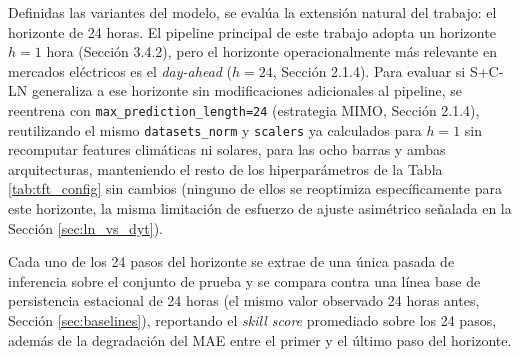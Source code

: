 Definidas las variantes del modelo, se evalúa la extensión natural del trabajo: el horizonte de 24 horas. El pipeline principal de este trabajo adopta un horizonte $h=1$ hora (Sección 3.4.2), pero el horizonte operacionalmente más relevante en mercados eléctricos es el \textit{day-ahead} ($h=24$, Sección 2.1.4). Para evaluar si S+C-LN generaliza a ese horizonte sin modificaciones adicionales al pipeline, se reentrena con \texttt{max\_prediction\_length=24} (estrategia MIMO, Sección 2.1.4), reutilizando el mismo \texttt{datasets\_norm} y \texttt{scalers} ya calculados para $h=1$ sin recomputar features climáticas ni solares, para las ocho barras y ambas arquitecturas, manteniendo el resto de los hiperparámetros de la Tabla \ref{tab:tft_config} sin cambios (ninguno de ellos se reoptimiza específicamente para este horizonte, la misma limitación de esfuerzo de ajuste asimétrico señalada en la Sección \ref{sec:ln_vs_dyt}).

Cada uno de los 24 pasos del horizonte se extrae de una única pasada de inferencia sobre el conjunto de prueba y se compara contra una línea base de persistencia estacional de 24 horas (el mismo valor observado 24 horas antes, Sección \ref{sec:baselines}), reportando el \textit{skill score} promediado sobre los 24 pasos, además de la degradación del MAE entre el primer y el último paso del horizonte.

